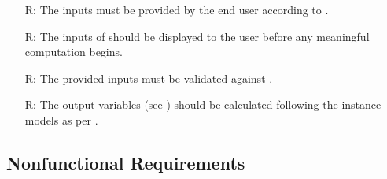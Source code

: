 \documentclass[12pt]{article}
\newcounter{reqnum} %
\begin{document}
\noindent
\begin{itemize}

    \item[R\refstepcounter{reqnum}\thereqnum \label{R_Inputs}:] The inputs must
        be provided by the end user according to .

    \item[R\refstepcounter{reqnum}\thereqnum \label{R_OutputInputs}:] The inputs
        of \progname{} should be displayed to the user before any meaningful
        computation begins.

    \item[R\refstepcounter{reqnum}\thereqnum \label{R_ValidateInputs}:] The
        provided inputs must be validated against .

    \item[R\refstepcounter{reqnum}\thereqnum \label{R_Calculate}:] The output
        variables (see ) should be calculated following the
        instance models as per .

\end{itemize}

\subsection{Nonfunctional Requirements}
\end{document}
